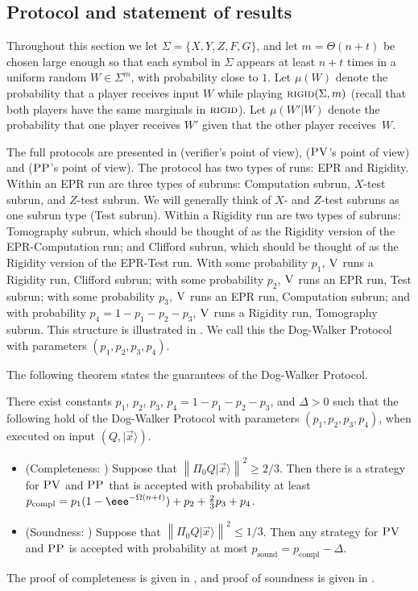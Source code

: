 \documentclass{toc}
\newcommand{\ket}[1]{|#1\rangle}
\DeclareMathOperator{\sound}{sound}
\DeclareMathOperator{\compl}{compl}
\newcommand{\norm}[1]{\left\|#1\right\|}
\newcommand{\rigid}{\textsc{rigid}}
\newcommand{\ver}{\textsc{V}}
\newcommand{\pv}{\textsc{PV}}
\newcommand{\pp}{\textsc{PP}}
\begin{document}
\subsection{Protocol and statement of results}


Throughout this section we 
let $\Sigma=\{X,Y,Z,F,G\}$, and let $m=\Theta(n+t)$ be chosen 
large enough so that each symbol in $\Sigma$ appears at least $n+t$ times in a uniform random $W\in\Sigma^m$, with probability close to $1$.
Let $\mu({W})$ denote the probability that a player receives input ${W}$ while playing $\rigid(\Sigma,m)$ (recall that both players have the same marginals in $\rigid$). Let $\mu({W}'|{W})$ denote the probability that one player receives ${W}'$ given that the other player receives~${W}$. 

The full protocols are presented in  (verifier's point of view),  ($\pv$'s point of view) and  ($\pp$'s point of view). The protocol has two 
types of runs: 
EPR and Rigidity. Within an EPR run are three 
types of subruns: 
Computation subrun, $X$-test subrun, and $Z$-test subrun. We will generally think of $X$- and $Z$-test subruns as one subrun type (Test subrun). Within a Rigidity run are two types of subruns: Tomography subrun, which should be thought of as the Rigidity version of the EPR-Computation run; and Clifford subrun, which should be thought of as the Rigidity version of the EPR-Test run. With some probability $p_1$, $\ver$ runs a Rigidity run, Clifford subrun; with some probability $p_2$, $\ver$ runs an EPR run, Test subrun; with some probability $p_3$, $\ver$ runs an EPR run, Computation subrun; and with probability $p_4=1-p_1-p_2-p_3$, $\ver$ runs a Rigidity run, Tomography subrun. This structure is illustrated in . We call this the Dog-Walker Protocol with parameters $(p_1,p_2,p_3,p_4)$.



The following theorem states the guarantees of the Dog-Walker Protocol.

\begin{theorem}\label{thm:dog-walker}
There exist constants $p_1$, $p_2$, $p_3$, $p_4=1-p_1-p_2-p_3$, and $\Delta>0$ such that the following hold of the Dog-Walker Protocol with parameters $(p_1,p_2,p_3,p_4)$, when executed on input $(Q,\ket{\vec{x}})$.
\begin{itemize}
\item (Completeness: ) Suppose that $\norm{\Pi_0Q\ket{\vec{x}}}^2\geq 2/3$. Then
  there is a strategy for $\pv$ and $\pp$ that is accepted with probability at
    least $p_{\compl}=p_1(1-\eee^{-\Omega(n+t)})+p_2+\frac{2}{3}p_3 +
    p_4$. 
\item (Soundness: ) Suppose that $\norm{\Pi_0Q\ket{\vec{x}}}^2\leq 1/3$. Then any strategy for $\pv$ and $\pp$ is accepted with probability at most $p_{\sound}=p_{\compl}-\Delta$. 
\end{itemize}
\end{theorem}
\noindent The proof of completeness is given in , and proof of soundness is given in . 
\end{document}

